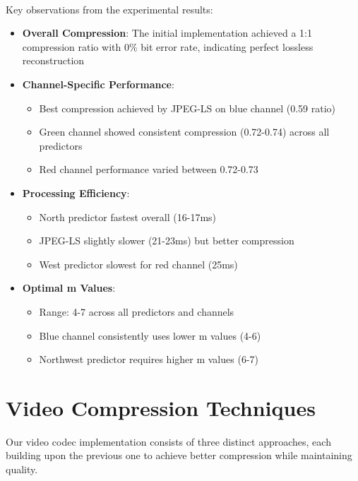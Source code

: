 \documentclass[a4paper,14pt]{article}
\begin{document}
\paragraph{}
Key observations from the experimental results:
\begin{itemize}
    \item \textbf{Overall Compression}: The initial implementation achieved a 1:1 compression ratio with 0\% bit error rate, indicating perfect lossless reconstruction
    
    \item \textbf{Channel-Specific Performance}:
    \begin{itemize}
        \item Best compression achieved by JPEG-LS on blue channel (0.59 ratio)
        \item Green channel showed consistent compression (0.72-0.74) across all predictors
        \item Red channel performance varied between 0.72-0.73
    \end{itemize}
    
    \item \textbf{Processing Efficiency}:
    \begin{itemize}
        \item North predictor fastest overall (16-17ms)
        \item JPEG-LS slightly slower (21-23ms) but better compression
        \item West predictor slowest for red channel (25ms)
    \end{itemize}
    
    \item \textbf{Optimal m Values}:
    \begin{itemize}
        \item Range: 4-7 across all predictors and channels
        \item Blue channel consistently uses lower m values (4-6)
        \item Northwest predictor requires higher m values (6-7)
    \end{itemize}
\end{itemize}

\section{Video Compression Techniques}
Our video codec implementation consists of three distinct approaches, each building upon the previous one to achieve better compression while maintaining quality.
\end{document}
